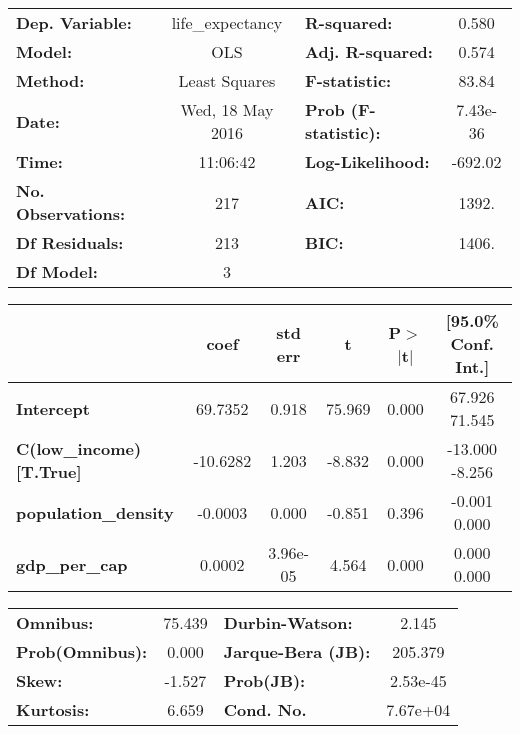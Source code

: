 \begin{center}
\begin{tabular}{lclc}
\toprule
\textbf{Dep. Variable:}        & life_expectancy  & \textbf{  R-squared:         } &     0.580   \\
\textbf{Model:}                &       OLS        & \textbf{  Adj. R-squared:    } &     0.574   \\
\textbf{Method:}               &  Least Squares   & \textbf{  F-statistic:       } &     83.84   \\
\textbf{Date:}                 & Wed, 18 May 2016 & \textbf{  Prob (F-statistic):} &  7.43e-36   \\
\textbf{Time:}                 &     11:06:42     & \textbf{  Log-Likelihood:    } &   -692.02   \\
\textbf{No. Observations:}     &         217      & \textbf{  AIC:               } &     1392.   \\
\textbf{Df Residuals:}         &         213      & \textbf{  BIC:               } &     1406.   \\
\textbf{Df Model:}             &           3      & \textbf{                     } &             \\
\bottomrule
\end{tabular}
\begin{tabular}{lccccc}
                               & \textbf{coef} & \textbf{std err} & \textbf{t} & \textbf{P$>$$|$t$|$} & \textbf{[95.0\% Conf. Int.]}  \\
\midrule
\textbf{Intercept}             &      69.7352  &        0.918     &    75.969  &         0.000        &        67.926    71.545       \\
\textbf{C(low_income)[T.True]} &     -10.6282  &        1.203     &    -8.832  &         0.000        &       -13.000    -8.256       \\
\textbf{population_density}    &      -0.0003  &        0.000     &    -0.851  &         0.396        &        -0.001     0.000       \\
\textbf{gdp_per_cap}           &       0.0002  &     3.96e-05     &     4.564  &         0.000        &         0.000     0.000       \\
\bottomrule
\end{tabular}
\begin{tabular}{lclc}
\textbf{Omnibus:}       & 75.439 & \textbf{  Durbin-Watson:     } &    2.145  \\
\textbf{Prob(Omnibus):} &  0.000 & \textbf{  Jarque-Bera (JB):  } &  205.379  \\
\textbf{Skew:}          & -1.527 & \textbf{  Prob(JB):          } & 2.53e-45  \\
\textbf{Kurtosis:}      &  6.659 & \textbf{  Cond. No.          } & 7.67e+04  \\
\bottomrule
\end{tabular}
\end{center}